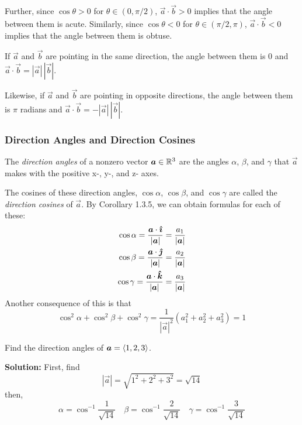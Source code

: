 Further, since \(\cos\theta > 0\) for \(\theta \in (0, \pi/2)\), \(\vec a\cdot \vec b>0\) implies that the angle between them is acute. Similarly, since \(\cos\theta < 0\) for \(\theta \in (\pi/2, \pi)\), \(\vec a \cdot \vec b<0\) implies that the angle between them is obtuse. \par
If \(\vec a\) and \(\vec b\) are pointing in the same direction, the angle between them is \(0\) and \(\vec a\cdot\vec b = |\vec a|\,|\vec b|\). \par
Likewise, if \(\vec a\) and \(\vec b\) are pointing in opposite directions, the angle between them is \(\pi\) radians and \(\vec a\cdot\vec b = -|\vec a|\,|\vec b|\).
\subsubsection{Direction Angles and Direction Cosines}
The \textit{direction angles} of a nonzero vector \(\boldsymbol{a} \in \mathbb{R}^3\) are the angles \(\alpha\), \(\beta\), and \(\gamma\) that \(\vec a\) makes with the positive x-, y-, and z- axes. \par
The cosines of these direction angles, \(\cos \alpha\), \(\cos\beta\), and \(\cos\gamma\) are called the \textit{direction cosines} of \(\vec a\). By Corollary 1.3.5, we can obtain formulas for each of these:
\begin{align*}
    \cos \alpha = \frac{\boldsymbol{a} \cdot  \boldsymbol{\hat{\imath}}}{|\boldsymbol{a}|} &= \frac{a_1}{|\boldsymbol{a}|} \\
    \cos \beta = \frac{\boldsymbol{a} \cdot \boldsymbol{\hat{\jmath}}}{|\boldsymbol{a}|} &= \frac{a_2}{|\boldsymbol{a}|} \\
    \cos \gamma = \frac{\boldsymbol{a} \cdot \boldsymbol{\hat{k}}}{|\boldsymbol{a}|} &= \frac{a_3}{|\boldsymbol{a}|}
\end{align*}
Another consequence of this is that
\[\cos^2\alpha + \cos^2\beta + \cos^2\gamma = \frac{1}{|\vec a|^2}(a_1^2+a_2^2+a_3^2) = 1\]
\begin{example}
    Find the direction angles of \(\boldsymbol{a} = \left\langle1,2,3\right\rangle\). \par
    \textbf{Solution: }
    First, find \[|\vec a| = \sqrt{1^2+2^2+3^2}=\sqrt{14}\]
    then,
    \[\alpha = \cos^{-1} \frac{1}{\sqrt{14}} \quad \beta = \cos^{-1}\frac{2}{\sqrt{14}} \quad \gamma = \cos^{-1}\frac{3}{\sqrt{14}}\]
\end{example}
